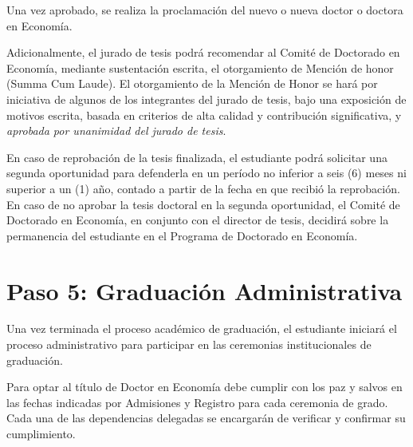 Una vez aprobado, se realiza la proclamación del nuevo o nueva doctor o doctora en Economía.

Adicionalmente, el jurado de tesis podrá recomendar al Comité de Doctorado en Economía, mediante sustentación escrita, el otorgamiento de Mención de honor (Summa Cum Laude). El otorgamiento de la Mención de Honor se hará por iniciativa de algunos de los integrantes del jurado de tesis, bajo una exposición de motivos escrita, basada en criterios de alta calidad y contribución significativa, y \emph{aprobada por unanimidad del jurado de tesis}.

En caso de reprobación de la tesis finalizada, el estudiante podrá solicitar una segunda oportunidad para defenderla en un período no inferior a seis (6) meses ni superior a un (1) año, contado a partir de la fecha en que recibió la reprobación. En caso de no aprobar la tesis doctoral en la segunda oportunidad, el Comité de Doctorado en Economía, en conjunto con el director de tesis, decidirá sobre la permanencia del estudiante en el Programa de Doctorado en Economía.

\section{Paso 5: Graduación Administrativa}

Una vez terminada el proceso académico de graduación, el estudiante iniciará el proceso administrativo para participar en las ceremonias institucionales de graduación.  

Para optar al título de Doctor en Economía debe cumplir con los paz y salvos en las fechas indicadas por Admisiones y Registro para cada ceremonia de grado. Cada una de las dependencias delegadas se encargarán de verificar y confirmar su cumplimiento.

